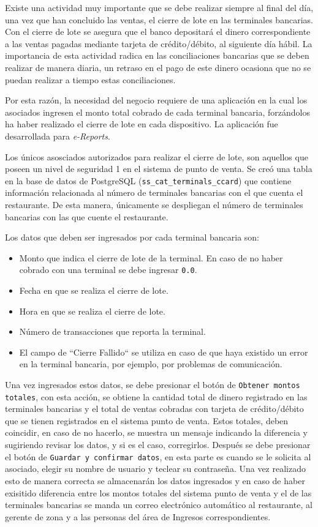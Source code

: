 Existe una actividad muy importante que se debe realizar siempre al final del día, una vez que han concluido las ventas, el cierre de lote en las terminales bancarias. Con el cierre de lote se asegura que el banco depositará el dinero correspondiente a las ventas pagadas mediante tarjeta de crédito/débito, al siguiente día hábil. La importancia de esta actividad radica en las conciliaciones bancarias que se deben realizar de manera diaria, un retraso en el pago de este dinero ocasiona que no se puedan realizar a tiempo estas conciliaciones.

Por esta razón, la necesidad del negocio requiere de una aplicación en la cual los asociados ingresen el monto total cobrado de cada terminal bancaria, forzándolos ha haber realizado el cierre de lote en cada dispositivo. La aplicación fue desarrollada para \textit{e-Reports}.

Los únicos asosciados autorizados para realizar el cierre de lote, son aquellos que poseen un nivel de seguridad 1 en el sistema de punto de venta. Se creó una tabla en la base de datos de PostgreSQL (\texttt{ss\_cat\_terminals\_ccard}) que contiene información relacionada al número de terminales bancarias con el que cuenta el restaurante. De esta manera, únicamente se despliegan el número de terminales bancarias con las que cuente el restaurante.

Los datos que deben ser ingresados por cada terminal bancaria son:

\begin{itemize}
 \item Monto que indica el cierre de lote de la terminal. En caso de no haber cobrado con una terminal se debe ingresar \texttt{0.0}.
 \item Fecha en que se realiza el cierre de lote.
 \item Hora en que se realiza el cierre de lote.
 \item Número de transacciones que reporta la terminal.
 \item El campo de ``Cierre Fallido`` se utiliza en caso de que haya existido un error en la terminal bancaria, por ejemplo, por problemas de comunicación.
\end{itemize}

Una vez ingresados estos datos, se debe presionar el botón de \texttt{Obtener montos totales}, con esta acción, se obtiene la cantidad total de dinero registrado en las terminales bancarias y el total de ventas cobradas con tarjeta de crédito/débito que se tienen registrados en el sistema punto de venta. Estos totales, deben coincidir, en caso de no hacerlo, se muestra un mensaje indicando la diferencia y sugiriendo revisar los datos, y si es el caso, corregirlos. Después se debe presionar el botón de \texttt{Guardar y confirmar datos}, en esta parte es cuando se le solicita al asociado, elegir su nombre de usuario y teclear su contraseña. Una vez realizado esto de manera correcta se almacenarán los datos ingresados y en caso de haber exisitido diferencia entre los montos totales del sistema punto de venta y el de las terminales bancarias se manda un correo electrónico automático al restaurante, al gerente de zona y a las personas del área de Ingresos correspondientes.


